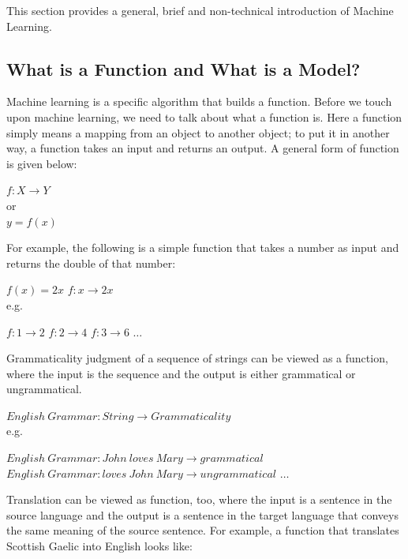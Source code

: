 \documentclass[final]{ua-thesis}
\numberwithin{equation}{section}
\begin{document}
This section provides a general, brief and non-technical introduction of Machine Learning.

\subsection{What is a Function and What is a Model?}
Machine learning is a specific algorithm that builds a function. Before we touch upon machine learning, we need to talk about what a function is. Here a function simply means a mapping from an object to another object; to put it in another way, a function takes an input and returns an output. A general form of function is given below:

\begin{exe}
\ex $f: X \rightarrow Y$\\
	or \\
	$ y=f(x) $
\end{exe} 


For example, the following is a simple function that takes a number as input and returns the double of that number:

\begin{exe}
\ex \label{math_function}
\begin{xlist}
\ex $f(x)=2x$
\ex $f: x \rightarrow 2x $\\
	e.g.
	\begin{xlist}
	\ex $f: 1 \rightarrow 2$
	\ex $f: 2 \rightarrow 4$
	\ex $f: 3 \rightarrow 6$
	\ex $\dots$
	\end{xlist}
\end{xlist}
\end{exe}

Grammaticality judgment of a sequence of strings can be viewed as a function, where the input is the sequence and the output is either grammatical or ungrammatical.  

\begin{exe}
\ex 
\begin{xlist}
\ex $English\ Grammar: String \rightarrow Grammaticality$\\
	e.g.
	\begin{xlist}
	\ex $English\ Grammar:  John\ loves\ Mary \rightarrow grammatical $
	\ex $English\ Grammar: loves\ John\ Mary \rightarrow ungrammatical $
	\ex $\dots$
	\end{xlist}
\end{xlist}
\end{exe}

Translation can be viewed as function, too, where the input is a sentence in the source language and the output is a sentence in the target language that conveys the same meaning of the source sentence. For example, a function that translates Scottish Gaelic into English looks like:   
\end{document}
